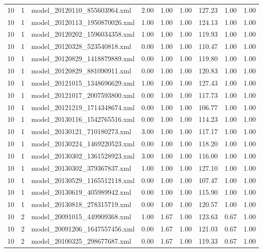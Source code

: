 \begin{table}[ht]
\begin{tabular}{rrlrrrrrr}
   10 &   1 & model\_20120110\_855603964.xml & 2.00 & 1.00 & 1.00 & 127.23 & 1.00 & 1.00 \\ 
   10 &   1 & model\_20120113\_1950870026.xml & 1.00 & 1.00 & 1.00 & 124.13 & 1.00 & 1.00 \\ 
   10 &   1 & model\_20120202\_1596034358.xml & 1.00 & 1.00 & 1.00 & 119.93 & 1.00 & 1.00 \\ 
   10 &   1 & model\_20120328\_523540818.xml & 0.00 & 1.00 & 1.00 & 110.47 & 1.00 & 1.00 \\ 
   10 &   1 & model\_20120829\_1418879889.xml & 0.00 & 1.00 & 1.00 & 119.80 & 1.00 & 1.00 \\ 
   10 &   1 & model\_20120829\_881090911.xml & 0.00 & 1.00 & 1.00 & 120.83 & 1.00 & 1.00 \\ 
   10 &   1 & model\_20121015\_1348696629.xml & 1.00 & 1.00 & 1.00 & 127.43 & 1.00 & 1.00 \\ 
   10 &   1 & model\_20121017\_2007593800.xml & 0.00 & 1.00 & 1.00 & 117.73 & 1.00 & 1.00 \\ 
   10 &   1 & model\_20121219\_1714348674.xml & 0.00 & 1.00 & 1.00 & 106.77 & 1.00 & 1.00 \\ 
   10 &   1 & model\_20130116\_1542765516.xml & 0.00 & 1.00 & 1.00 & 114.23 & 1.00 & 1.00 \\ 
   10 &   1 & model\_20130121\_710180273.xml & 3.00 & 1.00 & 1.00 & 117.17 & 1.00 & 1.00 \\ 
   10 &   1 & model\_20130224\_1469220523.xml & 0.00 & 1.00 & 1.00 & 118.20 & 1.00 & 1.00 \\ 
   10 &   1 & model\_20130302\_1361528923.xml & 3.00 & 1.00 & 1.00 & 116.00 & 1.00 & 1.00 \\ 
   10 &   1 & model\_20130302\_379367837.xml & 1.00 & 1.00 & 1.00 & 127.10 & 1.00 & 1.00 \\ 
   10 &   1 & model\_20130529\_1165512118.xml & 0.00 & 1.00 & 1.00 & 107.47 & 1.00 & 1.00 \\ 
   10 &   1 & model\_20130619\_405989942.xml & 0.00 & 1.00 & 1.00 & 115.90 & 1.00 & 1.00 \\ 
   10 &   1 & model\_20130818\_278315719.xml & 0.00 & 1.00 & 1.00 & 120.57 & 1.00 & 1.00 \\ 
   10 &   2 & model\_20091015\_449909368.xml & 1.00 & 1.67 & 1.00 & 123.63 & 0.67 & 1.00 \\ 
   10 &   2 & model\_20091206\_1647557456.xml & 0.00 & 1.67 & 1.00 & 121.03 & 0.67 & 1.00 \\ 
   10 &   2 & model\_20100325\_298677687.xml & 0.00 & 1.67 & 1.00 & 119.33 & 0.67 & 1.00 \\ 

\end{tabular}
\end{table}
